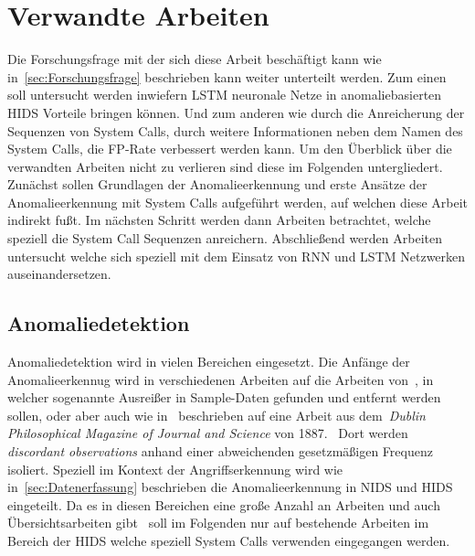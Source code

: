 \chapter{Verwandte Arbeiten}\label{ch:verwandte_arbeiten}

Die Forschungsfrage mit der sich diese Arbeit beschäftigt kann wie in~\autoref{sec:Forschungsfrage} beschrieben kann weiter unterteilt werden.
Zum einen soll untersucht werden inwiefern \ac{LSTM} neuronale Netze in anomaliebasierten \ac{HIDS} Vorteile bringen können.
Und zum anderen wie durch die Anreicherung der Sequenzen von System Calls, durch weitere Informationen neben dem Namen des System Calls, die \ac{FP}-Rate verbessert werden kann.
Um den Überblick über die verwandten Arbeiten nicht zu verlieren sind diese im Folgenden untergliedert.
Zunächst sollen Grundlagen der Anomalieerkennung und erste Ansätze der Anomalieerkennung mit System Calls aufgeführt werden, auf welchen diese Arbeit indirekt fußt.
Im nächsten Schritt werden dann Arbeiten betrachtet, welche speziell die System Call Sequenzen anreichern.
Abschließend werden Arbeiten untersucht welche sich speziell mit dem Einsatz von \ac{RNN} und \ac{LSTM} Netzwerken auseinandersetzen.

\section{Anomaliedetektion}

    Anomaliedetektion wird in vielen Bereichen eingesetzt.
    Die Anfänge der Anomalieerkennug wird in verschiedenen Arbeiten auf die Arbeiten von~\cite{ANOMALYDEFINITION1969}, in welcher sogenannte Ausreißer in Sample-Daten gefunden und entfernt werden sollen, oder aber auch wie in~\cite{ANOMALYSURVEY} beschrieben auf eine Arbeit aus dem~\textit{Dublin Philosophical Magazine of Journal and Science} von 1887.~\cite{ANOMALYDEFINITION1887}
    Dort werden \textit{discordant observations} anhand einer abweichenden gesetzmäßigen Frequenz isoliert. 
    Speziell im Kontext der Angriffserkennung wird wie in~\autoref{sec:Datenerfassung} beschrieben die Anomalieerkennung in \ac{NIDS} und \ac{HIDS} eingeteilt.
    Da es in diesen Bereichen eine große Anzahl an Arbeiten und auch Übersichtsarbeiten gibt~\cite{ANOMALYSURVEY, ANOMALYSURVEY3} soll im Folgenden nur auf bestehende Arbeiten im Bereich der \ac{HIDS} welche speziell System Calls verwenden eingegangen werden.

